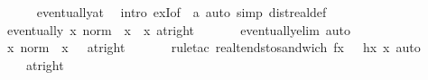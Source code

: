 \begin{isabellebody}
\ \ \ \ \isamarkupfalse%
\ eventually{\isacharunderscore}{\kern0pt}at\ \isamarkupfalse%
\ {\isacharparenleft}{\kern0pt}intro\ exI{\isacharbrackleft}{\kern0pt}of\ {\isacharunderscore}{\kern0pt}\ a{\isacharbrackright}{\kern0pt}{\isacharparenright}{\kern0pt}\ {\isacharparenleft}{\kern0pt}auto\ simp{\isacharcolon}{\kern0pt}\ dist{\isacharunderscore}{\kern0pt}real{\isacharunderscore}{\kern0pt}def{\isacharparenright}{\kern0pt}\isanewline
\ \ \isamarkupfalse%
\isanewline
\ \ \isamarkupfalse%
\ {\isasymzeta}\ \isamarkupfalse%
\ {\isachardoublequoteopen}eventually\ {\isacharparenleft}{\kern0pt}{\isasymlambda}x{\isachardot}{\kern0pt}\ norm\ {\isacharparenleft}{\kern0pt}{\isasymzeta}\ x{\isacharparenright}{\kern0pt}\ {\isasymle}\ x{\isacharparenright}{\kern0pt}\ {\isacharparenleft}{\kern0pt}at{\isacharunderscore}{\kern0pt}right\ {}{\isacharparenright}{\kern0pt}{\isachardoublequoteclose}\isanewline
\ \ \ \ \isamarkupfalse%
\ eventually{\isacharunderscore}{\kern0pt}elim\ auto\isanewline
\ \ \isamarkupfalse%
\ \isamarkupfalse%
\ {\isachardoublequoteopen}{\isacharparenleft}{\kern0pt}{\isacharparenleft}{\kern0pt}{\isasymlambda}x{\isachardot}{\kern0pt}\ norm\ {\isacharparenleft}{\kern0pt}{\isasymzeta}\ x{\isacharparenright}{\kern0pt}{\isacharparenright}{\kern0pt}\ {\isasymlonglongrightarrow}\ {}{\isacharparenright}{\kern0pt}\ {\isacharparenleft}{\kern0pt}at{\isacharunderscore}{\kern0pt}right\ {}{\isacharparenright}{\kern0pt}{\isachardoublequoteclose}\isanewline
\ \ \ \ \isamarkupfalse%
\ {\isacharparenleft}{\kern0pt}rule{\isacharunderscore}{\kern0pt}tac\ real{\isacharunderscore}{\kern0pt}tendsto{\isacharunderscore}{\kern0pt}sandwich{\isacharbrackleft}{\kern0pt}\ f{\isacharequal}{\kern0pt}{\isachardoublequoteopen}{\isasymlambda}x{\isachardot}{\kern0pt}\ {}{\isachardoublequoteclose}\ \ h{\isacharequal}{\kern0pt}{\isachardoublequoteopen}{\isasymlambda}x{\isachardot}{\kern0pt}\ x{\isachardoublequoteclose}{\isacharbrackright}{\kern0pt}{\isacharparenright}{\kern0pt}\ auto\isanewline
\ \ \isamarkupfalse%
\ \isamarkupfalse%
\ {\isachardoublequoteopen}{\isacharparenleft}{\kern0pt}{\isasymzeta}\ {\isasymlonglongrightarrow}\ {}{\isacharparenright}{\kern0pt}\ {\isacharparenleft}{\kern0pt}at{\isacharunderscore}{\kern0pt}right\ {}{\isacharparenright}{\kern0pt}{\isachardoublequoteclose}\isanewline

\end{isabellebody}
